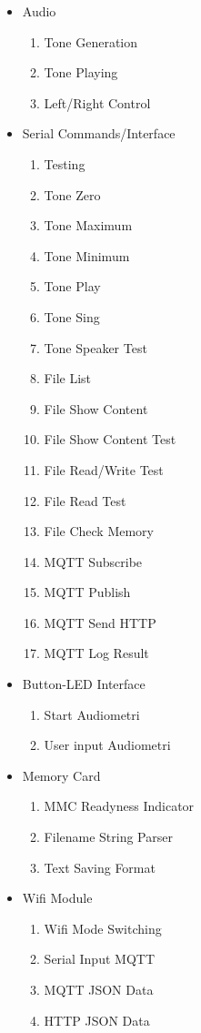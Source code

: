 \documentclass[12pt,]{article}
\begin{document}
	\begin{itemize}
		\item Audio
		\begin{enumerate}
			\item Tone Generation
			\item Tone Playing
			\item Left/Right Control
		\end{enumerate}
	
		\item Serial Commands/Interface
		\begin{enumerate}
			\item Testing
			\item Tone Zero
			\item Tone Maximum
			\item Tone Minimum
			\item Tone Play 
			\item Tone Sing
			\item Tone Speaker Test
			\item File List
			\item File Show Content
			\item File Show Content Test
			\item File Read/Write Test
			\item File Read Test
			\item File Check Memory
			\item MQTT Subscribe
			\item MQTT Publish
			\item MQTT Send HTTP
			\item MQTT Log Result
		\end{enumerate}
	
		\item Button-LED Interface
		\begin{enumerate}
			\item Start Audiometri
			\item User input Audiometri
		\end{enumerate}
	
		\item Memory Card
		\begin{enumerate}
			\item MMC Readyness Indicator
			\item Filename String Parser
			\item Text Saving Format
		\end{enumerate}
	
		\item Wifi Module
		\begin{enumerate}
			\item Wifi Mode Switching
			\item Serial Input MQTT
			\item MQTT JSON Data
			\item HTTP JSON Data
		\end{enumerate}
	\end{itemize}
\end{document}
